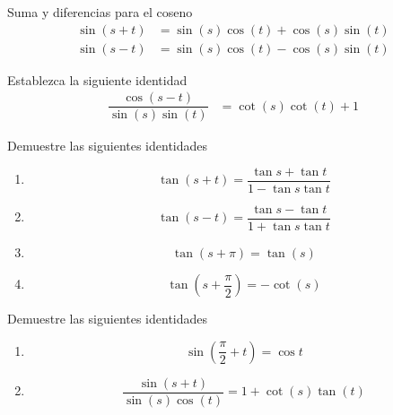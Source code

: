 {Suma y diferencias para el coseno}
	\begin{align*}
		\sin(s+t) &= \sin(s)\cos(t)+\cos(s)\sin(t) \\  
		\sin(s-t) &= \sin(s)\cos(t)-\cos(s)\sin(t)
	\end{align*}



	\begin{problema}
		Establezca la siguiente identidad
		\begin{align*}
			\dfrac{\cos\left(s-t\right)}{\sin(s)\sin(t)} 
			& = \cot(s)\cot(t)+1
		\end{align*}
	\end{problema}
	



	\begin{problema}
		Demuestre las siguientes identidades
		\begin{enumerate}
			\item $$ \tan(s+t)=\dfrac{\tan s + \tan t}{1- \tan s \tan t} $$ 
			\item $$ \tan(s-t)=\dfrac{\tan s - \tan t}{1+ \tan s \tan t} $$ 
			\item $$ \tan(s+\pi) = \tan(s) $$ 
			\item $$ \tan\left(s+\dfrac{\pi}{2}\right) = -\cot(s) $$
		\end{enumerate}
	\end{problema}



	\begin{problema}
		Demuestre las siguientes identidades
		\begin{enumerate}
			\item $$\sin\left(\dfrac{\pi}{2}+t\right) = \cos t$$
			\item $$\dfrac{\sin\left(s+t\right)}{\sin(s)\cos(t)} = 1+\cot(s)\tan(t)$$
		\end{enumerate}
	\end{problema}

